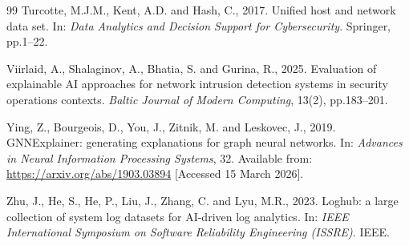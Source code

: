 \documentclass[12pt,a4paper]{report}
\begin{document}
\begin{thebibliography}{99}
Turcotte, M.J.M., Kent, A.D. and Hash, C., 2017. Unified host and network data set. In: \textit{Data Analytics and Decision Support for Cybersecurity}. Springer, pp.1--22.

Viirlaid, A., Shalaginov, A., Bhatia, S. and Gurina, R., 2025. Evaluation of explainable AI approaches for network intrusion detection systems in security operations contexts. \textit{Baltic Journal of Modern Computing}, 13(2), pp.183--201.

Ying, Z., Bourgeois, D., You, J., Zitnik, M. and Leskovec, J., 2019. GNNExplainer: generating explanations for graph neural networks. In: \textit{Advances in Neural Information Processing Systems}, 32. Available from: \url{https://arxiv.org/abs/1903.03894} [Accessed 15 March 2026].

Zhu, J., He, S., He, P., Liu, J., Zhang, C. and Lyu, M.R., 2023. Loghub: a large collection of system log datasets for AI-driven log analytics. In: \textit{IEEE International Symposium on Software Reliability Engineering (ISSRE)}. IEEE.

\end{thebibliography}
\end{document}
